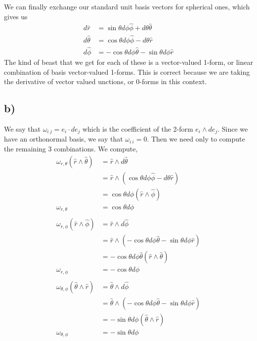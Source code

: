 \documentclass{article}
\theoremstyle{definition}
\begin{document}
We can finally exchange our standard unit basis vectors for spherical ones, which gives us
\begin{align}
    d\hat{r} &= \sin\theta d\phi \hat{\phi} + d\theta\hat\theta\\
    d\hat\theta &= \cos\theta d\phi\hat\phi - d\theta\hat r\\
    d\hat\phi &= -\cos\theta d\phi \hat\theta - \sin\theta d\phi \hat{r}
\end{align}
The kind of beast that we get for each of these is a vector-valued 1-form, or linear combination of basis vector-valued 1-forms.
This is correct because we are taking the derivative of vector valued unctions, or 0-forms in this context.
\subsection*{b)}
We say that $\omega_{i \ j} = e_i \cdot d e_j$ which is the coefficient of the 2-form $e_i \wedge d e_j$.
Since we have an orthonormal basis, we say that $\omega_{i \ i} = 0$. Then we need only to compute the remaining 3 combinations. We compute,
\begin{align}
    \omega_{r, \theta}(\hat{r}\wedge\hat{\theta}) &= \hat{r} \wedge d\hat{\theta}\\
    &= \hat{r} \wedge (\cos\theta d\phi\hat\phi - d\theta\hat r)\\
    &= \cos\theta d\phi (\hat{r} \wedge \hat{\phi})\\
    \omega_{r,\theta} &= \cos\theta d\phi \\\\
    \omega_{r, \phi}(\hat{r}\wedge\hat{\phi}) &= \hat{r} \wedge d\hat{\phi}\\
    &= \hat{r} \wedge (-\cos\theta d\phi \hat\theta - \sin\theta d\phi \hat{r})\\
    &= -\cos\theta d\phi \hat\theta(\hat{r} \wedge \hat\theta)\\
    \omega_{r,\phi} &= -\cos\theta d\phi\\\\
    \omega_{\theta,\phi}(\hat{\theta} \wedge\hat r) &= \hat\theta \wedge d\hat\phi\\
    &= \hat\theta\wedge(-\cos\theta d\phi \hat\theta - \sin\theta d\phi \hat{r})\\
    &= -\sin\theta d\phi (\hat\theta \wedge \hat r)\\
    \omega_{\theta,\phi} &= -\sin\theta d\phi
\end{align}
\end{document}
